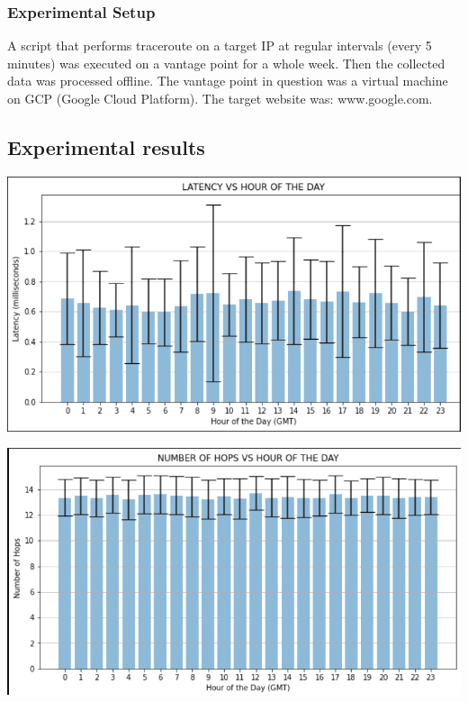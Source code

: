 \documentclass[a4paper,10pt]{article}
\begin{document}
\maketitle
\subsubsection{Experimental Setup}

A script that performs traceroute on a target IP at regular intervals (every 5 minutes) was executed on a vantage point for a whole week. Then the collected data was processed offline. The vantage point in question was a virtual machine on GCP (Google Cloud Platform). The target website was: www.google.com.

\subsection{Experimental results}


\includegraphics{latency_graph}


\includegraphics{hops_graph}
\end{document}
